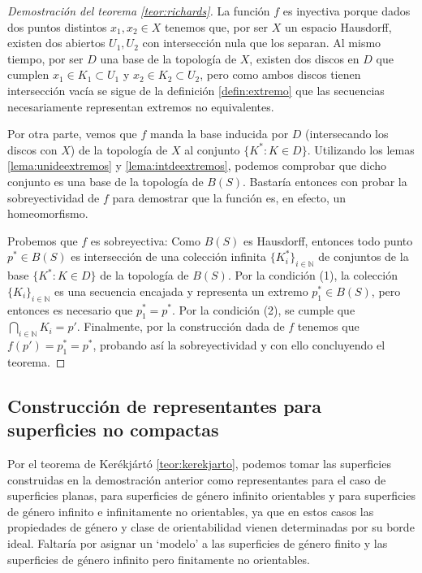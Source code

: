 \documentclass[a4paper,11pt,spanish, twoside, leqno]{tfg-uam}
\theoremstyle{definition}
\begin{document}
\begin{proof}[Demostración del teorema \ref{teor:richards}]
La función $f$ es inyectiva porque dados  dos puntos distintos  $x_1, x_2 \in X$ tenemos que, por ser $X$ un espacio Hausdorff, existen dos abiertos $U_1, U_2$ con intersección nula que los separan. Al mismo tiempo, por ser $D$ una base de la topología de $X$, existen dos discos en $D$ que cumplen $x_1 \in K_1 \subset U_1$ y $x_2 \in K_2 \subset U_2$, pero como ambos discos tienen intersección vacía se sigue de la definición \ref{defin:extremo} que las secuencias necesariamente representan extremos no equivalentes.

Por otra parte, vemos que $f$ manda la base inducida por $D$ (intersecando los discos con $X$) de la topología de $X$ al conjunto $\{K^*: K\in D\}$. Utilizando los lemas \ref{lema:unideextremos} y \ref{lema:intdeextremos}, podemos comprobar que dicho conjunto es una base de la topología de $B(S)$. Bastaría entonces con probar la sobreyectividad de $f$ para demostrar que la función es, en efecto, un homeomorfismo.

Probemos que $f$ es sobreyectiva: Como $B(S)$ es Hausdorff, entonces todo punto $p^* \in B(S)$ es intersección de una colección infinita $\{K_i^*\}_{i\in\mathbb{N}}$ de conjuntos de la base $\{K^*: K\in D\}$ de la topología de $B(S)$. Por la condición (1), la colección $\{K_i\}_{i\in\mathbb{N}}$ es una secuencia encajada y representa un extremo $p_1^* \in B(S)$, pero entonces es necesario que $p_1^* = p^*$.  Por la condición (2), se cumple que $\bigcap_{i\in\mathbb{N}} K_i = {p'}$. Finalmente, por la construcción dada de $f$ tenemos que $f(p') = p_1^* = p^*$, probando así la sobreyectividad y con ello concluyendo el teorema.

\end{proof}

\subsection{Construcción de representantes para superficies no compactas}
\label{sec:representantesnocompactos}
Por el teorema de Kerékjártó \ref{teor:kerekjarto}, podemos tomar las superficies construidas en la demostración anterior como representantes para el caso de superficies planas, para superficies de género infinito orientables y para superficies de género infinito e infinitamente no orientables, ya que en estos casos las propiedades de género y clase de orientabilidad vienen determinadas por su borde ideal. Faltaría por asignar un `modelo' a las superficies de género finito y las superficies de género infinito pero finitamente no orientables.
\end{document}
